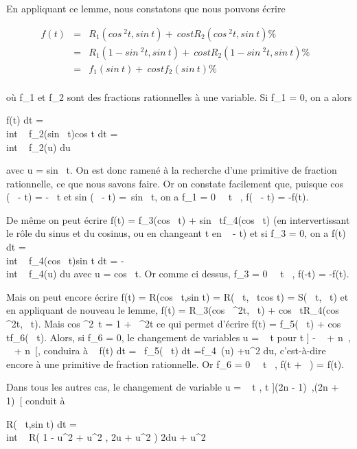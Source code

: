 \documentclass[]{article}
\begin{document}
En appliquant ce lemme, nous constatons que nous pouvons écrire

\begin{align*} f(t)& =&
R_1(cos~
^2t,sin~ t) +\
cos tR_ 2(cos~
^2t,sin~ t) \%&
\\ & =& R_1(1
- sin~
^2t,sin~ t) +\
cos t R_ 2(1 - sin~
^2t,sin~ t)\%&
\\ & =&
f_1(sin~ t) +\
cos t f_2(sin~ t) \%&
\\ \end{align*}

où f_1 et f_2 sont des fractions rationnelles à une
variable. Si f_1 = 0, on a alors

\int  f(t) dt =\\int ~
f_2(sin~
t)cos t dt =\\int ~
f_2(u) du

avec u = sin~ t. On est donc ramené à la
recherche d'une primitive de fraction rationnelle, ce que nous savons
faire. Or on constate facilement que, puisque
cos (\pi~ - t) = -\cos~ t
et sin (\pi~ - t) =\ sin~
t, on a f_1 = 0 \Leftrightarrow
\forall~~t \in \mathbb{R}~, f(\pi~ - t) = -f(t).

De même on peut écrire f(t) = f_3(cos~
t) + sin~
tf_4(cos~ t) (en intervertissant le
rôle du sinus et du cosinus, ou en changeant t en  \pi~
\over 2 - t) et si f_3 = 0, on a
\int  f(t) dt =\\int ~
f_4(cos~
t)sin t dt = -\\int ~
f_4(u) du avec u = cos~ t. Or comme ci
dessus, f_3 = 0 \Leftrightarrow
\forall~~t \in {}~, f(-t) = -f(t).

Mais on peut encore écrire f(t) = R(cos~
t,sin t) = R(\cos~
t,\mathrmtg~
tcos t) = S(\cos~
t,\mathrmtg~ t) et en
appliquant de nouveau le lemme, f(t) =
R_3(cos~
^2t,\mathrmtg~ t)
+ cos~
tR_4(cos~
^2t,\mathrmtg~ t).
Mais cos ^2~t = 1
+\mathrmtg~
^2t ce qui permet d'écrire f(t) =
f_5(\mathrmtg~ t)
+ cos~
tf_6(\mathrmtg~ t).
Alors, si f_6 = 0, le changement de variables u
= \mathrmtg~ t pour t \in]
- \pi~ \over 2 + n\pi~, \pi~  +
n\pi~[, conduira à \int ~ f(t) dt
=\int ~
f_5(\mathrmtg~ t)
dt =\int   f_4~(u) +u^2 du, c'est-à-dire encore à une primitive de fraction
rationnelle. Or f_6 = 0 \Leftrightarrow
\forall~~t \in \mathbb{R}~, f(t + \pi~) = f(t).

Dans tous les autres cas, le changement de variable u
= \mathrmtg~  t
 , t \in](2n - 1)\pi~,(2n + 1)\pi~[ conduit à

\int  R(\cos~
t,sin t) dt =\\int ~ R(
1 - u^2  + u^2 , 2u
 + u^2 ) 2du \over 1
+ u^2
\end{document}
